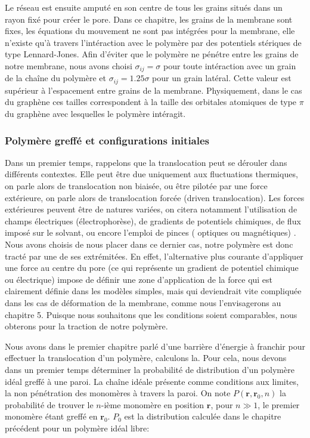 \documentclass[a4paper,11pt]{article}
\begin{document}
Le réseau est ensuite amputé en son centre de tous les grains situés dans un rayon fixé pour créer le pore. Dans ce chapitre, les grains de la membrane sont fixes, les équations du mouvement ne sont pas intégrées pour la membrane, elle n'existe qu'à travers l'intéraction avec le polymère par des potentiels stériques de type Lennard-Jones. Afin d'éviter que le polymère ne pénétre entre les grains de notre membrane, nous avons choisi $\sigma_{ij}=\sigma$ pour toute intéraction avec un grain de la chaîne du polymère et $\sigma_{ij}=1.25\sigma$ pour un grain latéral. Cette valeur est supérieur à l'espacement entre grains de la membrane. Physiquement, dans le cas du graphène ces tailles correspondent à la taille des orbitales atomiques de type $\pi$ du graphène avec lesquelles le polymère intéragit.


\subsubsection{Polymère greffé et configurations initiales}

Dans un premier temps, rappelons que la translocation peut se dérouler dans différents contextes. Elle peut être due uniquement aux fluctuations thermiques, on parle alors de translocation non biaisée, ou être pilotée par une force extérieure, on parle alors de translocation forcée (driven translocation). Les forces extérieures peuvent être de natures variées, on citera notamment l'utilisation de champs électriques (électrophorèse), de gradients de potentiels chimiques, de flux imposé sur le solvant, ou encore l'emploi de pinces ( optiques ou magnétiques) \cite{keyser}. Nous avons choisis de nous placer dans ce dernier cas, notre polymère est donc tracté par une de ses extrémitées. En effet, l'alternative plus courante d'appliquer une force au centre du pore (ce qui représente un gradient de potentiel chimique ou électrique) impose de définir une zone d'application de la force qui est clairement définie dans les modèles simples, mais qui deviendrait vite compliquée dans les cas de déformation de la membrane, comme nous l'envisagerons au chapitre 5. Puisque nous souhaitons que les conditions soient comparables, nous obterons pour la traction de notre polymère.



Nous avons dans le premier chapitre parlé d'une barrière d'énergie à franchir pour effectuer la translocation d'un polymère, calculons la. Pour cela, nous devons dans un premier temps déterminer la probabilité de distribution d'un polymère idéal greffé à une paroi. La chaîne idéale présente comme conditions aux limites, la non pénétration des monomères à travers la paroi. On note $P(\textbf{r},\textbf{r}_0,n)$ la probabilité de trouver le $n$-ième monomère en position $\textbf{r}$, pour $n \gg 1$, le premier monomère étant greffé en $\textbf{r}_0$. $P_0$ est la distribution calculée dans le chapitre précédent pour un polymère idéal libre:
\end{document}
